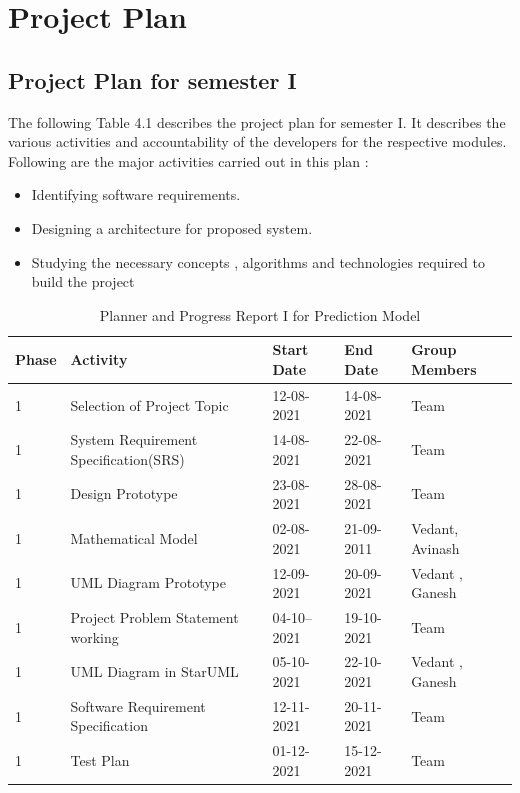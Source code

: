\documentclass[openany,12pt]{report}
\begin{document}
\section{Project Plan}

\subsection{Project Plan for semester I}

The following Table 4.1 describes the project plan for semester I. It describes the various activities and accountability of the developers for the respective modules. Following are the major activities carried out in this plan :
\begin{itemize}
\item{Identifying software requirements.}
\item{Designing a architecture for proposed system.}
\item{Studying the necessary concepts , algorithms and technologies required to build the project}
\end{itemize}


\newpage
\begin{table} [htb]
\centering
\begin{tabular}{|p{1.2cm}|p{5cm}|p{2.5cm}|p{2.5cm}|p{3cm}| }\hline
\textbf{Phase} 	&\textbf{Activity}	&\textbf{Start Date}	&\textbf{End Date} &\textbf{Group Members}\\\hline\hline
1 &Selection of Project Topic	&12-08-2021 	&14-08-2021 &Team \\\hline
1 &System Requirement Specification(SRS) &14-08-2021 &22-08-2021 &Team\\\hline
1 &Design Prototype &23-08-2021 &28-08-2021 &Team\\\hline
1 &Mathematical Model &02-08-2021 &21-09-2011 & Vedant, Avinash \\\hline
1 &UML Diagram Prototype &12-09-2021 &20-09-2021 &Vedant , Ganesh \\\hline
1 &Project Problem Statement working &04-10--2021 &19-10-2021 & Team\\\hline
1 &UML Diagram in StarUML &05-10-2021 &22-10-2021 & Vedant , Ganesh \\\hline
1 &Software Requirement Specification &12-11-2021 &20-11-2021 &Team \\\hline
1 &Test Plan &01-12-2021 &15-12-2021 &Team \\\hline
\end{tabular}
\caption{Planner and Progress Report I for Prediction Model}
\label{tab:nnwork}
\end{table}
\end{document}

